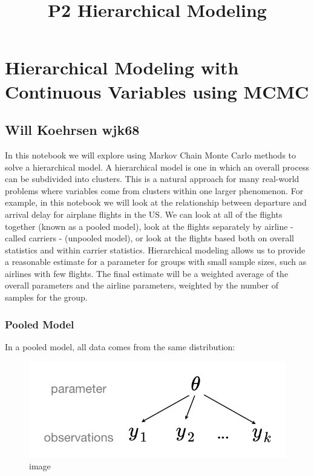 \documentclass[11pt]{article}
\title{P2 Hierarchical Modeling}
\makeatletter
\def\maxwidth{\ifdim\Gin@nat@width>\linewidth\linewidth
    \else\Gin@nat@width\fi}
\let\Oldincludegraphics\includegraphics
\renewcommand{\includegraphics}[1]{\Oldincludegraphics[width=.8\maxwidth]{#1}}
\makeatother
\begin{document}
    
    
    \maketitle
    
    

    
    \hypertarget{hierarchical-modeling-with-continuous-variables-using-mcmc}{%
\section{Hierarchical Modeling with Continuous Variables using
MCMC}\label{hierarchical-modeling-with-continuous-variables-using-mcmc}}

\hypertarget{will-koehrsen-wjk68}{%
\subsection{Will Koehrsen wjk68}\label{will-koehrsen-wjk68}}

In this notebook we will explore using Markov Chain Monte Carlo methods
to solve a hierarchical model. A hierarchical model is one in which an
overall process can be subdivided into clusters. This is a natural
approach for many real-world problems where variables come from clusters
within one larger phenomenon. For example, in this notebook we will look
at the relationship between departure and arrival delay for airplane
flights in the US. We can look at all of the flights together (known as
a pooled model), look at the flights separately by airline - called
carriers - (unpooled model), or look at the flights based both on
overall statistics and within carrier statistics. Hierarchical modeling
allows us to provide a reasonable estimate for a parameter for groups
with small sample sizes, such as airlines with few flights. The final
estimate will be a weighted average of the overall parameters and the
airline parameters, weighted by the number of samples for the group.

\hypertarget{pooled-model}{%
\subsubsection{Pooled Model}\label{pooled-model}}

In a pooled model, all data comes from the same distribution:

\begin{figure}
\centering
\includegraphics{images/pooled.png}
\caption{image}
\end{figure}
\end{document}
